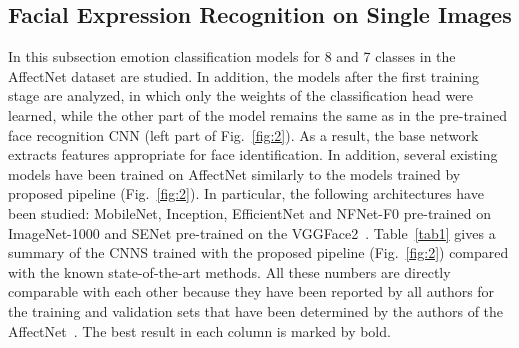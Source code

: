 \documentclass[runningheads]{llncs}
\begin{document}
\subsection{Facial Expression Recognition on Single Images}\label{sec:4.2}
In this subsection emotion classification models for 8 and 7 classes in the AffectNet dataset are studied. In addition, the models after the first training stage are analyzed, in which only the weights of the classification head were learned, while the other part of the model remains the same as in the pre-trained face recognition CNN (left part of Fig.~\ref{fig:2}). As a result, the base network extracts features appropriate for face identification. In addition, several existing models have been trained on AffectNet similarly to the models trained by proposed pipeline (Fig.~\ref{fig:2}). In particular, the following architectures have been studied: MobileNet, Inception, EfficientNet and NFNet-F0 pre-trained on ImageNet-1000 and SENet pre-trained on the VGGFace2~\cite{cao2018vggface2}. Table~\ref{tab1} gives a summary of the CNNS trained with the proposed pipeline (Fig.~\ref{fig:2}) compared with the known state-of-the-art methods. All these numbers are directly comparable with each other because they have been reported by all authors for the training and validation sets that have been determined by the authors of the AffectNet~\cite{mollahosseini2017affectnet}. The best result in each column is marked by bold.
\end{document}
